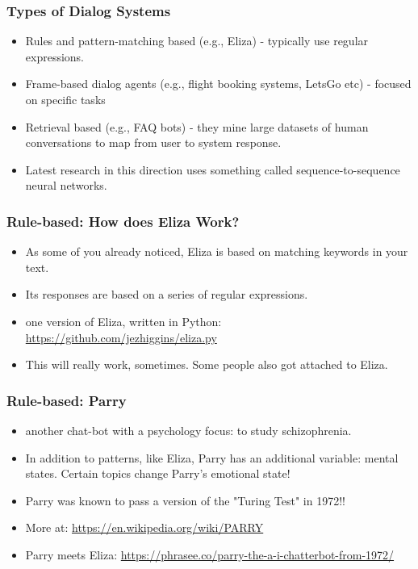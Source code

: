 \documentclass{beamer}
\begin{document}
\begin{frame}
\frametitle{Types of Dialog Systems}
\begin{itemize}
\item Rules and pattern-matching based (e.g., Eliza) - typically use regular expressions.
\item Frame-based dialog agents (e.g., flight booking systems, LetsGo etc) - focused on specific tasks 
\item Retrieval based (e.g., FAQ bots) - they mine large datasets of human conversations to map from user to system response.
\item Latest research in this direction uses something called sequence-to-sequence neural networks.
\end{itemize}
\end{frame}

\begin{frame}
\frametitle{Rule-based: How does Eliza Work?}
\begin{itemize}
\item As some of you already noticed, Eliza is based on matching keywords in your text. 
\item Its responses are based on a series of regular expressions. 
\item one version of Eliza, written in Python: \url{https://github.com/jezhiggins/eliza.py}
\item This will really work, sometimes. Some people also got attached to Eliza.
\end{itemize}
\end{frame}

\begin{frame}
\frametitle{Rule-based: Parry}
\begin{itemize}
\item another chat-bot with a psychology focus: to study schizophrenia.
\item In addition to patterns, like Eliza, Parry has an additional variable: mental states. Certain topics change Parry's emotional state!
\item Parry was known to pass a version of the "Turing Test" in 1972!!
\item More at: \url{https://en.wikipedia.org/wiki/PARRY}
\item Parry meets Eliza: \url{https://phrasee.co/parry-the-a-i-chatterbot-from-1972/}
\end{itemize}
\end{frame}
\end{document}
